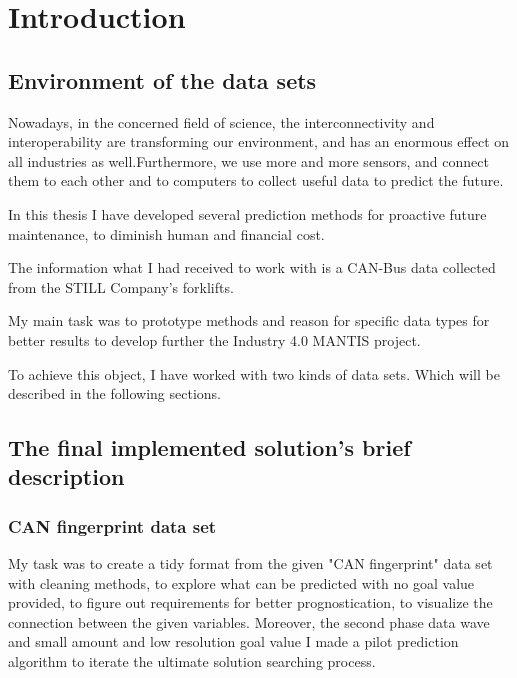 \chapter*{Introduction}
\section{Environment of the data sets}
Nowadays, in the concerned field of science, the interconnectivity and interoperability are transforming our environment, and has an enormous effect on all industries as well.Furthermore, we use more and more sensors, and connect them to each other and to computers to collect useful data to predict the future.

In this thesis I have developed several prediction methods for proactive future maintenance, to diminish human and financial cost.

The information what I had received to work with is a CAN-Bus data collected from the STILL Company's forklifts.

My main task was to prototype methods and reason for specific data types for better results to develop further the Industry 4.0 MANTIS project.

To achieve this object, I have worked with two kinds of data sets. Which will be described in the following sections.
\section{The final implemented solution's brief description}
    \subsection{CAN fingerprint data set}
My task was to create a tidy format from the given "CAN fingerprint" data set with cleaning methods, to explore what can be predicted with no goal value provided, to figure out requirements for better prognostication, to visualize the connection between the given variables. Moreover, the second phase data wave and small amount and low resolution goal value I made a pilot prediction algorithm to iterate the ultimate solution searching process. 
